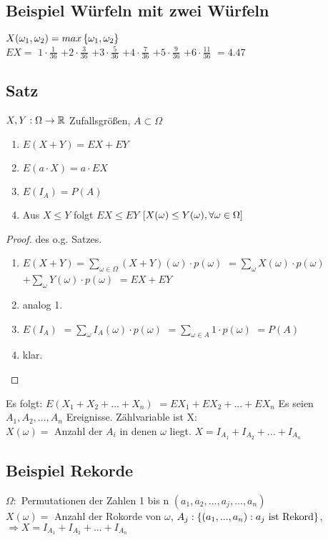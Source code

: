 \subsection{Beispiel Würfeln mit zwei Würfeln}
$ X(\omega_1, \omega_2) = max \left\lbrace \omega_1, \omega_2 \right\rbrace $\\
$ E X = $
$ 1 \cdot \frac{1}{36}$
$ + 2 \cdot \frac{3}{36}$ 
$ + 3 \cdot \frac{5}{36}$ 
$ + 4 \cdot \frac{7}{36}$ 
$ + 5 \cdot \frac{9}{36}$ 
$ + 6 \cdot \frac{11}{36}$ 
$= 4.47 $

\subsection{Satz}
\begin{satz}
$X, Y : \Omega \rightarrow \mathbb{R} $ Zufallsgrößen, $ A \subset \Omega$

\begin{enumerate}
\item $ E(X+Y) = E X + E Y $
\item $ E(a \cdot X) = a \cdot E X$
\item $ E(I_A) = P(A) $
\item Aus $X \leq Y$ folgt $ E X \leq E Y $ $  \left[ X(\omega) \leq Y(\omega), \forall \omega \in \Omega \right]  $
\end{enumerate}
\end{satz}

\begin{proof} des o.g. Satzes. 
\begin{enumerate}
\item $ E(X+Y) = \sum_{\omega \in \Omega} (X+Y)(\omega) \cdot p(\omega)$
$= \sum_{\omega} X(\omega) \cdot p(\omega) $
$+ \sum_{\omega} Y(\omega) \cdot p(\omega) $
$ = E X + E Y $
\item analog 1.
\item $E(I_A) $
$=\sum_{\omega} I_A(\omega) \cdot p(\omega) $
$= \sum_{\omega \in A} 1 \cdot p(\omega)$
$= P(A)$
\item klar.
\end{enumerate}
\end{proof}
Es folgt: $ E(X_1 + X_2 + ... + X_n) $
$ = E X_1 + E X_2 + ... + E X_n $
Es seien $A_1, A_2, ..., A_n$ Ereignisse. Zählvariable ist X: \\
$X(\omega) = $ Anzahl der $A_i$ in denen $\omega$ liegt. $ X = I_{A_1} + I_{A_2} + ... + I_{A_n}$

\subsection{Beispiel Rekorde}
$\Omega: $ Permutationen der Zahlen 1 bis n $(a_1,a_2,...,a_j,...,a_n)$ \\
$X(\omega) = $ Anzahl der Rokorde von $\omega$, $A_j:  \left\lbrace  \left( a_1, ..., a_n \right)  : a_j \textrm{ ist Rekord} \right\rbrace $, $\Rightarrow X = I_{A_1} + I_{A_2} + ... + I_{A_n}$\\

